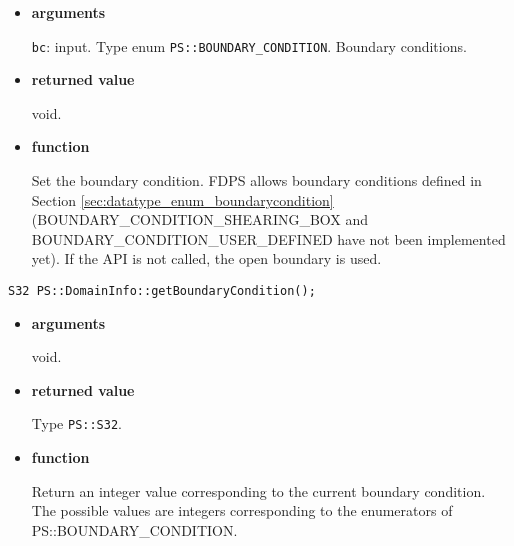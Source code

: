 \begin{itemize}

\item {\bf arguments}


\texttt{bc}: input. Type enum \texttt{PS::BOUNDARY\_CONDITION}. Boundary conditions.

\item {\bf returned value}

void.

\item {\bf function}

Set the boundary condition. FDPS allows boundary conditions defined
in Section \ref{sec:datatype_enum_boundarycondition}
(BOUNDARY\_CONDITION\_SHEARING\_BOX and
BOUNDARY\_CONDITION\_USER\_DEFINED have not been implemented yet). If
the API is not called, the open boundary is used.


\end{itemize}


\begin{screen}
\begin{verbatim}
S32 PS::DomainInfo::getBoundaryCondition();
\end{verbatim}
\end{screen}

\begin{itemize}

\item {\bf arguments}

void.

\item {\bf returned value}

Type \texttt{PS::S32}.

\item {\bf function}

Return an integer value corresponding to the current boundary condition.
The possible values are integers corresponding to the enumerators of PS::BOUNDARY\_CONDITION.

\end{itemize}


